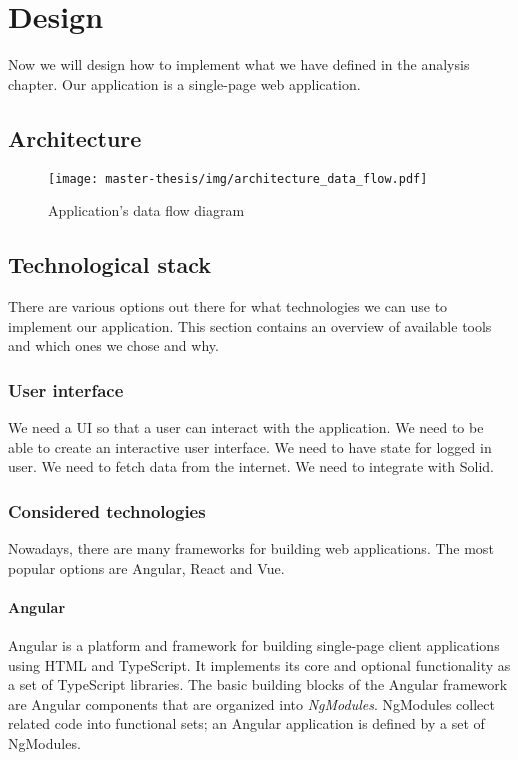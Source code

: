 \chapter{Design}
Now we will design how to implement what we have defined in the analysis chapter.
Our application is a single-page web application.

\section{Architecture}
\begin{figure}[h]
  \centering
  \texttt{[image: master-thesis/img/architecture\_data\_flow.pdf]}
  \caption{Application's data flow diagram}
\end{figure}

\section{Technological stack}
There are various options out there for what technologies we can use to implement our application.
This section contains an overview of available tools and which ones we chose and why.

\subsection{User interface}
We need a UI so that a user can interact with the application.
We need to be able to create an interactive user interface.
We need to have state for logged in user.
We need to fetch data from the internet.
We need to integrate with Solid.

\subsection*{Considered technologies}
Nowadays, there are many frameworks for building web applications.
The most popular options are Angular, React and Vue.

\subsubsection*{Angular}
Angular is a platform and framework for building single-page client applications using HTML and TypeScript. 
It implements its core and optional functionality as a set of TypeScript libraries. 
The basic building blocks of the Angular framework are Angular components that are organized into \emph{NgModules}. 
NgModules collect related code into functional sets; an Angular application is defined by a set of NgModules.

